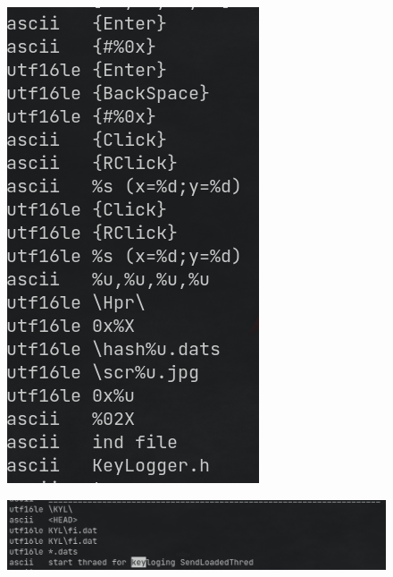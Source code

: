 \documentclass[10pt,a4paper]{article}
\begin{document}
	\begin{figure}[!htbp]%
		\centering
		\includegraphics[width=\columnwidth]{pics/sus13.png}
	\end{figure}
	\begin{figure}[!htbp]%
		\centering
		\includegraphics[width=\columnwidth]{pics/sus14.png}
	\end{figure}
\end{document}
